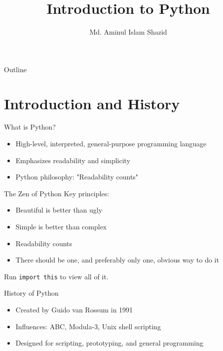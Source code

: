 \documentclass[12pt, aspectratio=169]{beamer}
\title{Introduction to Python}
\author{Md. Aminul Islam Shazid}
\date{}
\begin{document}
    {
		\addtocounter{framenumber}{-2}    %

		\begin{frame}
			\titlepage
		\end{frame}

		\begin{frame}{Outline}
            \vfill
			\tableofcontents[subsectionstyle=hide]
            \vfill
		\end{frame}
	}

    \section{Introduction and History}

    \begin{frame}{What is Python?}
        \begin{itemize}
            \item High-level, interpreted, general-purpose programming language
            \item Emphasizes readability and simplicity
            \item Python philosophy: "Readability counts"
        \end{itemize}
    \end{frame}


    \begin{frame}{The Zen of Python}
        Key principles:
        \begin{itemize}
            \item Beautiful is better than ugly
            \item Simple is better than complex
            \item Readability counts
            \item There should be one, and preferably only one, obvious way to do it
        \end{itemize}

        Run \texttt{import this} to view all of it.
    \end{frame}

    
    \begin{frame}{History of Python}
        \begin{itemize}
            \item Created by Guido van Rossum in 1991
            \item Influences: ABC, Modula-3, Unix shell scripting
            \item Designed for scripting, prototyping, and general programming
        \end{itemize}
    \end{frame}
\end{document}
